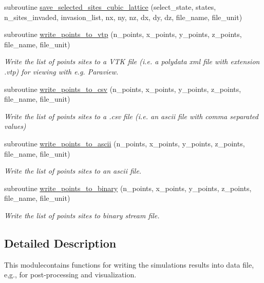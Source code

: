 \begin{DoxyCompactItemize}
subroutine \hyperlink{classmodule__write__output__files_a352c5578525c6ae1cf3b27ae535f29d7}{save\-\_\-selected\-\_\-sites\-\_\-cubic\-\_\-lattice} (select\-\_\-state, states, n\-\_\-sites\-\_\-invaded, invasion\-\_\-list, nx, ny, nz, dx, dy, dz, file\-\_\-name, file\-\_\-unit)
\item 
subroutine \hyperlink{classmodule__write__output__files_a9d1d4e84225ea6841af4aba75bc3f513}{write\-\_\-points\-\_\-to\-\_\-vtp} (n\-\_\-points, x\-\_\-points, y\-\_\-points, z\-\_\-points, file\-\_\-name, file\-\_\-unit)
\begin{DoxyCompactList}\small\item\em \-Write the list of points sites to a \-V\-T\-K file (i.\-e. a polydata xml file with extension .vtp) for viewing with e.\-g. \-Paraview. \end{DoxyCompactList}\item 
subroutine \hyperlink{classmodule__write__output__files_abfb1114cfc68ccb7574e800405d987fe}{write\-\_\-points\-\_\-to\-\_\-csv} (n\-\_\-points, x\-\_\-points, y\-\_\-points, z\-\_\-points, file\-\_\-name, file\-\_\-unit)
\begin{DoxyCompactList}\small\item\em \-Write the list of points sites to a .csv file (i.\-e. an ascii file with comma separated values) \end{DoxyCompactList}\item 
subroutine \hyperlink{classmodule__write__output__files_a2a4a5e5bafeb70b518474f4d72aa67cd}{write\-\_\-points\-\_\-to\-\_\-ascii} (n\-\_\-points, x\-\_\-points, y\-\_\-points, z\-\_\-points, file\-\_\-name, file\-\_\-unit)
\begin{DoxyCompactList}\small\item\em \-Write the list of points sites to an ascii file. \end{DoxyCompactList}\item 
subroutine \hyperlink{classmodule__write__output__files_a06e16bb131fd2b2a3646fa9b7b8bbe2d}{write\-\_\-points\-\_\-to\-\_\-binary} (n\-\_\-points, x\-\_\-points, y\-\_\-points, z\-\_\-points, file\-\_\-name, file\-\_\-unit)
\begin{DoxyCompactList}\small\item\em \-Write the list of points sites to binary stream file. \end{DoxyCompactList}\end{DoxyCompactItemize}


\subsection{\-Detailed \-Description}
\-This modulecontains functions for writing the simulations results into data file, e,g., for post-\/processing and visualization. 

